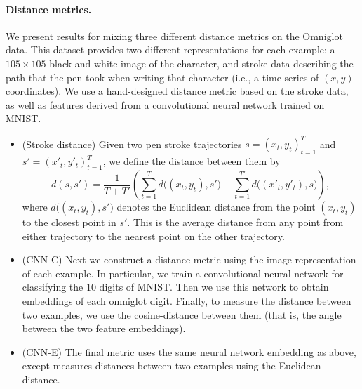 \paragraph{Distance metrics.} We present results for mixing three different
distance metrics on the Omniglot data. This dataset provides two different
representations for each example: a $105 \times 105$ black and white image of
the character, and stroke data describing the path that the pen took when
writing that character (i.e., a time series of $(x,y)$ coordinates). We use a
hand-designed distance metric based on the stroke data, as well as features
derived from a convolutional neural network trained on MNIST.
%
\begin{itemize}
  \item (Stroke distance) Given two pen stroke trajectories $s = (x_t,
  y_t)_{t=1}^T$ and $s' = (x'_t, y'_t)_{t=1}^T$, we define the distance between
  them by
  \[
    d(s,s') = \frac{1}{T + T'} \left(
      \sum_{t=1}^T d\bigl((x_t, y_t), s'\bigr)
      +
      \sum_{t=1}^{T'} d\bigl((x'_t, y'_t), s\bigr)
    \right),
  \]
  where $d\bigl((x_t, y_t), s'\bigr)$ denotes the Euclidean distance from the
  point $(x_t, y_t)$ to the closest point in $s'$. This is the average distance
  from any point from either trajectory to the nearest point on the other
  trajectory.
  \item (CNN-C) Next we construct a distance metric using the image
  representation of each example. In particular, we train a convolutional neural
  network for classifying the 10 digits of MNIST. Then we use this network to
  obtain embeddings of each omniglot digit. Finally, to measure the distance
  between two examples, we use the cosine-distance between them (that is, the
  angle between the two feature embeddings).
  \item (CNN-E) The final metric uses the same neural network embedding as
  above, except measures distances between two examples using the Euclidean
  distance.
\end{itemize}

